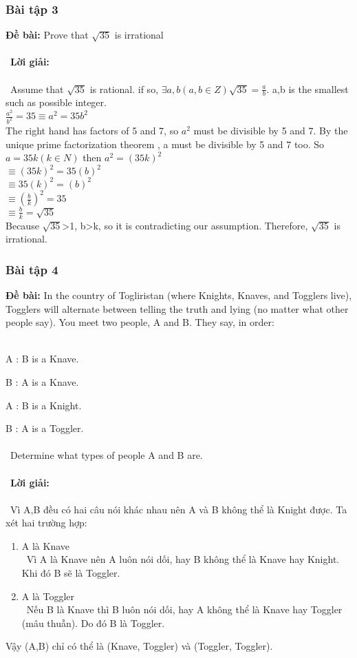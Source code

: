 \documentclass[a4paper]{article}
\begin{document}
\begin{enumerate}
\subsubsection{Bài tập 3}
\textbf{Đề bài:} Prove that $\sqrt{35}$ is irrational
\\\ \\\
\textbf{Lời giải:} \\\ \\\
Assume that $\sqrt{35}$ is rational. if so, $\exists a,b (a,b \in Z) \sqrt{35}=\frac{a}{b}$. a,b is the smallest such as possible integer.\\
$\frac{a^{2}}{b^{2}}=35 \equiv a^{2}=35b^{2}$\\
The right hand has factors of 5 and 7, so $a^{2}$ must be divisible by 5 and 7. By the unique prime factorization theorem , a must be divisible by 5 and 7 too. So $a=35k (k \in N)$ then $a^{2}=(35k)^{2}$\\
$\equiv (35k)^{2}=35(b)^{2}$\\
$\equiv 35(k)^{2}=(b)^{2}$\\
$\equiv (\frac{b}{k})^{2}=35$\\
$\equiv \frac{b}{k}=\sqrt{35}$\\
Because $\sqrt{35}$>1, b>k, so it is contradicting our assumption. Therefore, $\sqrt{35}$ is irrational. 
\clearpage
\subsubsection{Bài tập 4}
\textbf{Đề bài:} In the country of Togliristan (where Knights, Knaves, and Togglers live), Togglers will alternate between telling the truth and lying (no matter what other people say). You meet two people, A and B. They say, in order: \\\

A : B is a Knave. 

B : A is a Knave.

A : B is a Knight.

B : A is a Toggler.\\\ \\\
Determine what types of people A and B are. \\\ \\\
\textbf{Lời giải:} \\\ \\\
Vì A,B đều có hai câu nói khác nhau nên A và B không thể là Knight được. Ta xét hai trường hợp: 
\begin{enumerate}
\item A là Knave \\\
Vì A là Knave nên A luôn nói dối, hay B không thể là Knave hay Knight. Khi đó B sẽ là Toggler.
\item A là Toggler \\\
Nếu B là Knave thì B luôn nói dối, hay A không thể là Knave hay Toggler (mâu thuẫn). Do đó B là Toggler.
\end{enumerate}
Vậy (A,B) chỉ có thể là (Knave, Toggler) và (Toggler, Toggler).


\end{enumerate}
\end{document}
